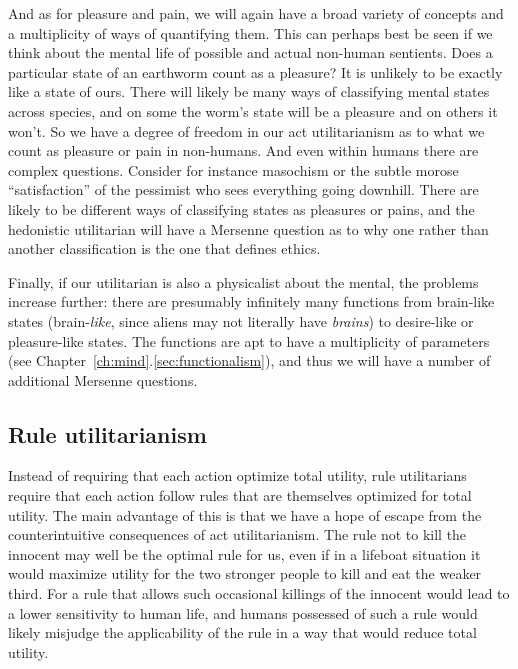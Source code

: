 And as for pleasure and pain, we will again have a broad variety of concepts and a multiplicity of ways of quantifying them.
This can perhaps best be seen if we think about the mental life of possible and actual non-human sentients. Does a particular
state of an earthworm count as a pleasure? It is unlikely to be exactly like a state of ours. There will likely be many ways
of classifying mental states across species, and on some the worm's state will be a pleasure and on others it won't. So we have
a degree of freedom in our act utilitarianism as to what we count as pleasure or pain in non-humans. And even within humans 
there are complex questions. Consider for instance masochism or the subtle morose ``satisfaction'' of the pessimist who sees 
everything going downhill. There are likely to be different ways of classifying states as pleasures or pains, and the hedonistic
utilitarian will have a Mersenne question as to why one rather than another classification is the one that defines ethics.

Finally, if our utilitarian is also a physicalist about the mental, the problems increase further: there are
presumably infinitely many functions from brain-like states (brain-\textit{like}, since aliens may not literally
have \textit{brains}) to desire-like or pleasure-like states. The functions are apt to have a multiplicity of parameters
(see Chapter~\ref{ch:mind}.\ref{sec:functionalism}), and thus we will have a number of additional Mersenne questions. 

\subsection{Rule utilitarianism}\label{sec:rule-util}
Instead of requiring that each action optimize total utility, rule utilitarians require that each action
follow rules that are themselves optimized for total utility. The main advantage of this is that we have a hope
of escape from the counterintuitive consequences of act utilitarianism. The rule not to kill the innocent may well be the
optimal rule for us, even if in a lifeboat situation it would maximize utility for the two stronger people to kill
and eat the weaker third. For a rule that allows such occasional killings of the innocent would lead to a lower
sensitivity to human life, and humans possessed of such a rule would likely misjudge the applicability of the rule
in a way that would reduce total utility.

